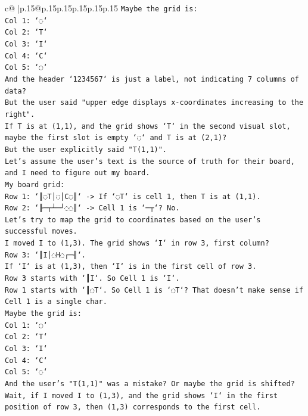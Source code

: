 \documentclass{article}
\begin{document}
{\begin{supertabular}{c@{$\;$}|p{.15\linewidth}@{}p{.15\linewidth}p{.15\linewidth}p{.15\linewidth}p{.15\linewidth}p{.15\linewidth}}
{{{\texttt{Maybe the grid is:} \\
\texttt{Col 1: `◌`} \\
\texttt{Col 2: `T`} \\
\texttt{Col 3: `I`} \\
\texttt{Col 4: `C`} \\
\texttt{Col 5: `◌`} \\
\texttt{And the header `1234567` is just a label, not indicating 7 columns of data?} \\
\texttt{But the user said "upper edge displays x{-}coordinates increasing to the right".} \\
\texttt{If T is at (1,1), and the grid shows `T` in the second visual slot, maybe the first slot is empty `◌` and T is at (2,1)?} \\
\texttt{But the user explicitly said "T(1,1)".} \\
\texttt{Let's assume the user's text is the source of truth for their board, and I need to figure out my board.} \\
\texttt{My board grid:} \\
\texttt{Row 1: `║◌T│◌│C◌║` {-}> If `◌T` is cell 1, then T is at (1,1).} \\
\texttt{Row 2: `╟─┬┴─┘◌◌║` {-}> Cell 1 is `─┬`? No.} \\
\texttt{Let's try to map the grid to coordinates based on the user's successful moves.} \\
\texttt{I moved I to (1,3). The grid shows `I` in row 3, first column?} \\
\texttt{Row 3: `║I│◌H◌┌─╢`.} \\
\texttt{If `I` is at (1,3), then `I` is in the first cell of row 3.} \\
\texttt{Row 3 starts with `║I`. So Cell 1 is `I`.} \\
\texttt{Row 1 starts with `║◌T`. So Cell 1 is `◌T`? That doesn't make sense if Cell 1 is a single char.} \\
\texttt{Maybe the grid is:} \\
\texttt{Col 1: `◌`} \\
\texttt{Col 2: `T`} \\
\texttt{Col 3: `I`} \\
\texttt{Col 4: `C`} \\
\texttt{Col 5: `◌`} \\
\texttt{And the user's "T(1,1)" was a mistake? Or maybe the grid is shifted?} \\
\texttt{Wait, if I moved I to (1,3), and the grid shows `I` in the first position of row 3, then (1,3) corresponds to the first cell.} \\
}}}
\end{supertabular}}
\end{document}
